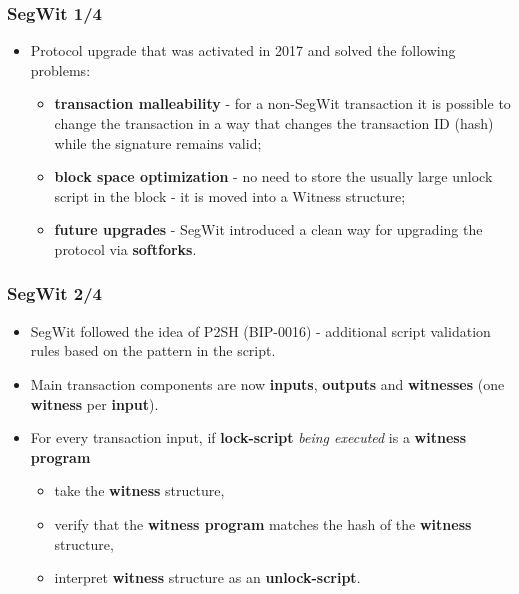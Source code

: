 \documentclass{beamer}
\begin{document}
\begin{frame}
  \frametitle{SegWit 1/4}
  \begin{itemize}
  \item Protocol upgrade that was activated in 2017 and solved the following
    problems:
    \begin{itemize}
    \item \textbf{transaction malleability} - for a non-SegWit transaction it is
      possible to change the transaction in a way that changes the transaction
      ID (hash) while the signature remains valid;
    \item \textbf{block space optimization} - no need to store the usually large
      unlock script in the block - it is moved into a Witness structure;
    \item \textbf{future upgrades} - SegWit introduced a clean way for upgrading
      the protocol via \textbf{softforks}.
    \end{itemize}
  \end{itemize}
\end{frame}

\begin{frame}
  \frametitle{SegWit 2/4}
  \begin{itemize}
  \item SegWit followed the idea of P2SH (BIP-0016) - additional script
    validation rules based on the pattern in the script.
  \item Main transaction components are now \textbf{inputs}, \textbf{outputs}
    and \textbf{witnesses} (one \textbf{witness} per \textbf{input}).
  \item For every transaction input, if \textbf{lock-script} \textit{being
      executed} is a \textbf{witness program}
    \begin{itemize}
    \item take the \textbf{witness} structure, 
    \item verify that the \textbf{witness program} matches the hash of the
      \textbf{witness} structure,
    \item interpret \textbf{witness} structure as an \textbf{unlock-script}.
    \end{itemize}
  \end{itemize}
\end{frame}
\end{document}
